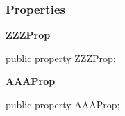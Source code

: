 \documentclass{report}
\newif\ifpdf
\begin{document}
\subsubsection*{\large{\textbf{Properties}}\normalsize\hspace{1ex}\hfill}
\begin{list}{}{
\setlength{\itemindent}{0cm}
\setlength{\listparindent}{0cm}
\setlength{\leftmargin}{\evensidemargin}
\addtolength{\leftmargin}{\tmplength}
\settowidth{\labelsep}{X}
\addtolength{\leftmargin}{\labelsep}
\setlength{\labelwidth}{\tmplength}
}
\label{ok_sorting.TMyClass-ZZZProp}
\item[\textbf{ZZZProp}\hfill]
\ifpdf
\begin{flushleft}
\fi
\begin{ttfamily}
public property ZZZProp;\end{ttfamily}

\ifpdf
\end{flushleft}
\fi


\par  \label{ok_sorting.TMyClass-AAAProp}
\item[\textbf{AAAProp}\hfill]
\ifpdf
\begin{flushleft}
\fi
\begin{ttfamily}
public property AAAProp;\end{ttfamily}

\ifpdf
\end{flushleft}
\fi


\par  \end{list}
\end{document}
